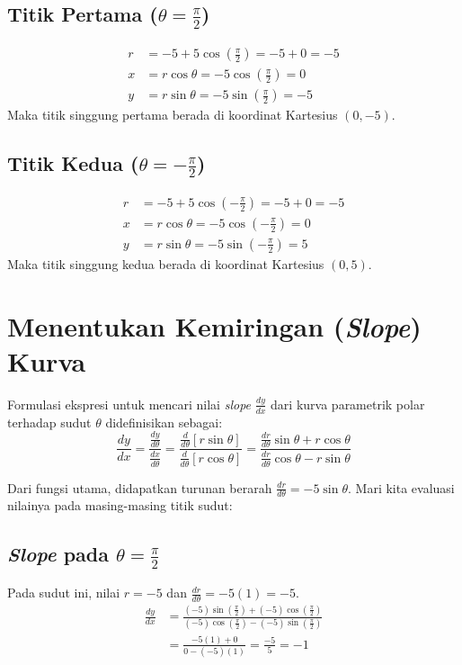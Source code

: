 \documentclass[11pt,a4paper]{article}
\begin{document}
\subsection{Titik Pertama ($\theta = \frac{\pi}{2}$)}
\begin{align*}
  r &= -5 + 5\cos\left(\frac{\pi}{2}\right) = -5 + 0 = -5 \\
  x &= r\cos\theta = -5\cos\left(\frac{\pi}{2}\right) = 0 \\
  y &= r\sin\theta = -5\sin\left(\frac{\pi}{2}\right) = -5
\end{align*}
Maka titik singgung pertama berada di koordinat Kartesius \textbf{$(0, -5)$}.

\subsection{Titik Kedua ($\theta = -\frac{\pi}{2}$)}
\begin{align*}
  r &= -5 + 5\cos\left(-\frac{\pi}{2}\right) = -5 + 0 = -5 \\
  x &= r\cos\theta = -5\cos\left(-\frac{\pi}{2}\right) = 0 \\
  y &= r\sin\theta = -5\sin\left(-\frac{\pi}{2}\right) = 5
\end{align*}
Maka titik singgung kedua berada di koordinat Kartesius \textbf{$(0, 5)$}.

\section{Menentukan Kemiringan (\textit{Slope}) Kurva}
Formulasi ekspresi untuk mencari nilai \textit{slope} $\frac{dy}{dx}$ dari kurva parametrik polar terhadap sudut $\theta$ didefinisikan sebagai:
\begin{equation}
  \frac{dy}{dx} = \frac{\frac{dy}{d\theta}}{\frac{dx}{d\theta}} = \frac{\frac{d}{d\theta}[r\sin\theta]}{\frac{d}{d\theta}[r\cos\theta]} = \frac{\frac{dr}{d\theta}\sin\theta + r\cos\theta}{\frac{dr}{d\theta}\cos\theta - r\sin\theta}
\end{equation}

Dari fungsi utama, didapatkan turunan berarah $\frac{dr}{d\theta} = -5\sin\theta$. Mari kita evaluasi nilainya pada masing-masing titik sudut:

\subsection{\textit{Slope} pada $\theta = \frac{\pi}{2}$}
Pada sudut ini, nilai $r = -5$ dan $\frac{dr}{d\theta} = -5(1) = -5$.
\begin{align*}
  \frac{dy}{dx} &= \frac{(-5)\sin(\frac{\pi}{2}) + (-5)\cos(\frac{\pi}{2})}{(-5)\cos(\frac{\pi}{2}) - (-5)\sin(\frac{\pi}{2})} \\
  &= \frac{-5(1) + 0}{0 - (-5)(1)} = \frac{-5}{5} = -1
\end{align*}
\end{document}
